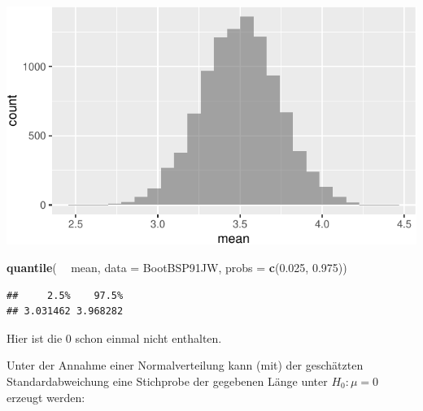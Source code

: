 \documentclass[12pt,ngerman,paper=a4,pagesize,DIV=13]{scrreprt}
\newenvironment{Shaded}{\begin{snugshade}}{\end{snugshade}}
\newcommand{\CommentTok}[1]{\textcolor[rgb]{0.56,0.35,0.01}{\textit{#1}}}
\newcommand{\DataTypeTok}[1]{\textcolor[rgb]{0.13,0.29,0.53}{#1}}
\newcommand{\DecValTok}[1]{\textcolor[rgb]{0.00,0.00,0.81}{#1}}
\newcommand{\FloatTok}[1]{\textcolor[rgb]{0.00,0.00,0.81}{#1}}
\newcommand{\KeywordTok}[1]{\textcolor[rgb]{0.13,0.29,0.53}{\textbf{#1}}}
\newcommand{\NormalTok}[1]{#1}
\newcommand{\OperatorTok}[1]{\textcolor[rgb]{0.81,0.36,0.00}{\textbf{#1}}}
\newcommand{\StringTok}[1]{\textcolor[rgb]{0.31,0.60,0.02}{#1}}
\begin{document}
\includegraphics{DatenerhebungStatistik-Uebung_files/figure-latex/unnamed-chunk-124-1.pdf}

\begin{Shaded}
\begin{Highlighting}[]
\KeywordTok{quantile}\NormalTok{( }\OperatorTok{~}\StringTok{ }\NormalTok{mean, }\DataTypeTok{data =}\NormalTok{ BootBSP91JW, }\DataTypeTok{probs =} \KeywordTok{c}\NormalTok{(}\FloatTok{0.025}\NormalTok{, }\FloatTok{0.975}\NormalTok{))}
\end{Highlighting}
\end{Shaded}

\begin{verbatim}
##     2.5%    97.5% 
## 3.031462 3.968282
\end{verbatim}

Hier ist die \(0\) schon einmal nicht enthalten.

Unter der Annahme einer Normalverteilung kann (mit) der geschätzten
Standardabweichung eine Stichprobe der gegebenen Länge unter
\(H_0: \mu=0\) erzeugt werden:

\begin{Shaded}
\end{Shaded}
\end{document}
